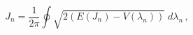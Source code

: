 \begin{equation}
J_n = \frac1{2\pi}\oint \sqrt{2(E(J_n)-V(\lambda_n))}\;d\lambda_n \,,
\end{equation}

